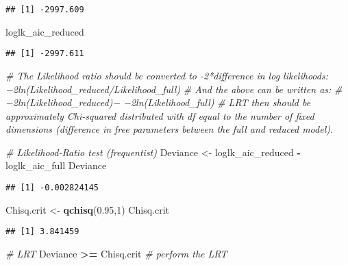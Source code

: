 \documentclass[]{article}
\newenvironment{Shaded}{\begin{snugshade}}{\end{snugshade}}
\newcommand{\CommentTok}[1]{\textcolor[rgb]{0.56,0.35,0.01}{\textit{#1}}}
\newcommand{\DecValTok}[1]{\textcolor[rgb]{0.00,0.00,0.81}{#1}}
\newcommand{\FloatTok}[1]{\textcolor[rgb]{0.00,0.00,0.81}{#1}}
\newcommand{\KeywordTok}[1]{\textcolor[rgb]{0.13,0.29,0.53}{\textbf{#1}}}
\newcommand{\NormalTok}[1]{#1}
\newcommand{\OperatorTok}[1]{\textcolor[rgb]{0.81,0.36,0.00}{\textbf{#1}}}
\newcommand{\StringTok}[1]{\textcolor[rgb]{0.31,0.60,0.02}{#1}}
\begin{document}
\begin{verbatim}
## [1] -2997.609
\end{verbatim}

\begin{Shaded}
\begin{Highlighting}[]
\NormalTok{loglk_aic_reduced}
\end{Highlighting}
\end{Shaded}

\begin{verbatim}
## [1] -2997.611
\end{verbatim}

\begin{Shaded}
\begin{Highlighting}[]
\CommentTok{# The Likelihood ratio should be converted to -2*difference in log likelihoods: −2ln(Likelihood_reduced/Likelihood_full)}
\CommentTok{# And the above can be written as:}
\CommentTok{# −2ln(Likelihood_reduced)− −2ln(Likelihood_full)}
\CommentTok{# LRT then should be approximately Chi-squared distributed with df equal to the number of fixed dimensions (difference in free parameters between the full and reduced model).}

\CommentTok{# Likelihood-Ratio test (frequentist)}
\NormalTok{Deviance <-}\StringTok{ }\NormalTok{loglk_aic_reduced }\OperatorTok{-}\StringTok{ }\NormalTok{loglk_aic_full }
\NormalTok{Deviance}
\end{Highlighting}
\end{Shaded}

\begin{verbatim}
## [1] -0.002824145
\end{verbatim}

\begin{Shaded}
\begin{Highlighting}[]
\NormalTok{Chisq.crit <-}\StringTok{ }\KeywordTok{qchisq}\NormalTok{(}\FloatTok{0.95}\NormalTok{,}\DecValTok{1}\NormalTok{)}
\NormalTok{Chisq.crit}
\end{Highlighting}
\end{Shaded}

\begin{verbatim}
## [1] 3.841459
\end{verbatim}

\begin{Shaded}
\begin{Highlighting}[]
\CommentTok{# LRT}
\NormalTok{Deviance }\OperatorTok{>=}\StringTok{ }\NormalTok{Chisq.crit   }\CommentTok{# perform the LRT}
\end{Highlighting}
\end{Shaded}
\end{document}
